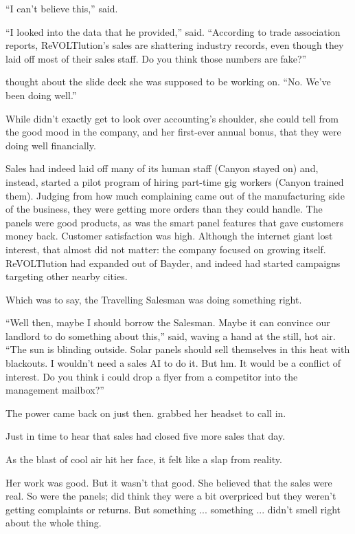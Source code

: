 ``I can't believe this,'' {\protag} said.

``I looked into the data that he provided,'' {\sidetag} said. ``According to trade association reports, ReVOLTlution's sales are shattering industry records, even though they laid off most of their sales staff. Do you think those numbers are fake?''

{\protag} thought about the slide deck she was supposed to be working on. ``No. We’ve been doing well.''

While {\protag} didn’t exactly get to look over accounting's shoulder, she could tell from the good mood in the company, and her first-ever annual bonus, that they were doing well financially.

Sales had indeed laid off many of its human staff (Canyon stayed on) and, instead, started a pilot program of hiring part-time gig workers (Canyon trained them). Judging from how much complaining came out of the manufacturing side of the business, they were getting more orders than they could handle. The panels were good products, as was the smart panel features that gave customers money back. Customer satisfaction was high. Although the internet giant lost interest, that almost did not matter: the company focused on growing itself. ReVOLTlution had expanded out of Bayder, and indeed had started campaigns targeting other nearby cities.

Which was to say, the Travelling Salesman was doing something right.

``Well then, maybe I should borrow the Salesman. Maybe it can convince our landlord to do something about this,'' {\protag} said, waving a hand at the still, hot air. ``The sun is blinding outside. Solar panels should sell themselves in this heat with blackouts. I wouldn't need a sales AI to do it. But hm. It would be a conflict of interest. Do you think i could drop a flyer from a competitor into the management mailbox?''

The power came back on just then. {\protag} grabbed her headset to call in.

Just in time to hear that sales had closed five more sales that day.

As the blast of cool air hit her face, it felt like a slap from reality.

Her work was good. But it wasn't that good. She believed that the sales were real. So were the panels; {\protag} did think they were a bit overpriced but they weren't getting complaints or returns. But something ... something ... didn't smell right about the whole thing.

